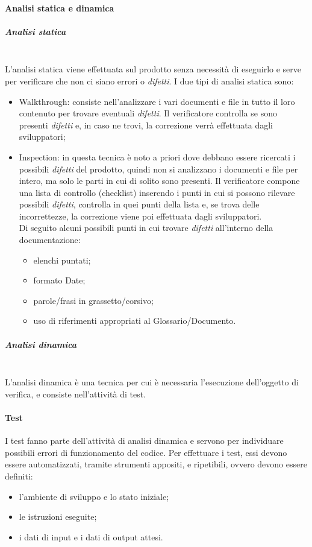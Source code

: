         \paragraph{Analisi statica e dinamica}
            \subparagraph{Analisi statica}\mbox{}\\
                L'analisi statica viene effettuata sul prodotto senza necessità di eseguirlo e serve per verificare che non ci siano errori o \textit{difetti}. I due tipi di analisi statica sono:
                \begin{itemize}
                    \item Walkthrough: consiste nell'analizzare i vari documenti e file in tutto il loro contenuto per trovare eventuali \textit{difetti}. Il verificatore controlla se sono presenti \textit{difetti} e, in caso ne trovi, la correzione verrà effettuata dagli sviluppatori; 
                    \item Inspection: in questa tecnica è noto a priori dove debbano essere ricercati i possibili \textit{difetti} del prodotto, quindi non si analizzano i documenti e file per intero, ma solo le parti in cui di solito sono presenti. Il verificatore compone una lista di controllo (checklist) inserendo i punti in cui si possono rilevare possibili \textit{difetti}, controlla in quei punti della lista e, se trova delle incorrettezze, la correzione viene poi effettuata dagli sviluppatori. \\
			Di seguito alcuni possibili punti in cui trovare \textit{difetti} all'interno della documentazione:
			\begin{itemize}
				\item elenchi puntati;
				\item formato Date;
				\item parole/frasi in grassetto/corsivo;
				\item uso di riferimenti appropriati al Glossario/Documento.
			\end{itemize}
                \end{itemize}
            \subparagraph{Analisi dinamica}\mbox{}\\
                L'analisi dinamica è una tecnica per cui è necessaria l'esecuzione dell'oggetto di verifica, e consiste nell'attività di test.

            \paragraph{Test}
    			I test fanno parte dell'attività di analisi dinamica e servono per individuare possibili errori di funzionamento del codice. Per effettuare i test, essi devono essere automatizzati, tramite strumenti appositi, e ripetibili, ovvero devono essere definiti:
    			\begin{itemize}
    				\item l'ambiente di sviluppo e lo stato iniziale;
    				\item le istruzioni eseguite;
    				\item i dati di input e i dati di output attesi.
    			\end{itemize}

